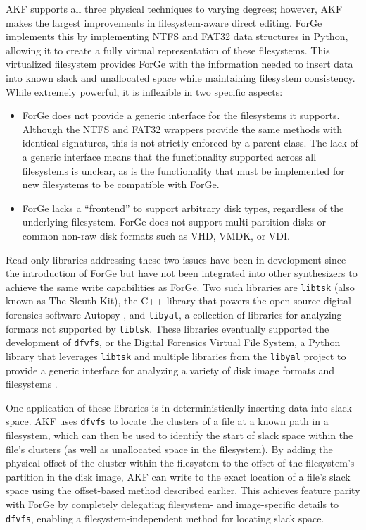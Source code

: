 \documentclass[final,5p,times,twocolumn]{elsarticle}
\newcommand{\passthrough}[1]{#1}
\begin{document}
AKF supports all three physical techniques to varying degrees; however,
AKF makes the largest improvements in filesystem-aware direct editing.
ForGe \citep{vistiAutomaticCreationComputer2015} implements this by
implementing NTFS and FAT32 data structures in Python, allowing it to
create a fully virtual representation of these filesystems. This
virtualized filesystem provides ForGe with the information needed to
insert data into known slack and unallocated space while maintaining
filesystem consistency. While extremely powerful, it is inflexible in
two specific aspects:

\begin{itemize}
\item
  ForGe does not provide a generic interface for the filesystems it
  supports. Although the NTFS and FAT32 wrappers provide the same
  methods with identical signatures, this is not strictly enforced by a
  parent class. The lack of a generic interface means that the
  functionality supported across all filesystems is unclear, as is the
  functionality that must be implemented for new filesystems to be
  compatible with ForGe.
\item
  ForGe lacks a ``frontend'' to support arbitrary disk types, regardless
  of the underlying filesystem. ForGe does not support multi-partition
  disks or common non-raw disk formats such as VHD, VMDK, or VDI.
\end{itemize}

Read-only libraries addressing these two issues have been in development
since the introduction of ForGe but have not been integrated into other
synthesizers to achieve the same write capabilities as ForGe. Two such
libraries are \passthrough{\lstinline!libtsk!} (also known as The Sleuth
Kit), the C++ library that powers the open-source digital forensics
software Autopsy \citep{SleuthkitSleuthkit2025}, and
\passthrough{\lstinline!libyal!}, a collection of libraries for
analyzing formats not supported by \passthrough{\lstinline!libtsk!}.
These libraries eventually supported the development of
\passthrough{\lstinline!dfvfs!}, or the Digital Forensics Virtual File
System, a Python library that leverages \passthrough{\lstinline!libtsk!}
and multiple libraries from the \passthrough{\lstinline!libyal!} project
to provide a generic interface for analyzing a variety of disk image
formats and filesystems \citep{Log2timelineDfvfs2025}.

One application of these libraries is in deterministically inserting
data into slack space. AKF uses \passthrough{\lstinline!dfvfs!} to
locate the clusters of a file at a known path in a filesystem, which can
then be used to identify the start of slack space within the file's
clusters (as well as unallocated space in the filesystem). By adding the
physical offset of the cluster within the filesystem to the offset of
the filesystem's partition in the disk image, AKF can write to the exact
location of a file's slack space using the offset-based method described
earlier. This achieves feature parity with ForGe by completely
delegating filesystem- and image-specific details to
\passthrough{\lstinline!dfvfs!}, enabling a filesystem-independent
method for locating slack space.
\end{document}
